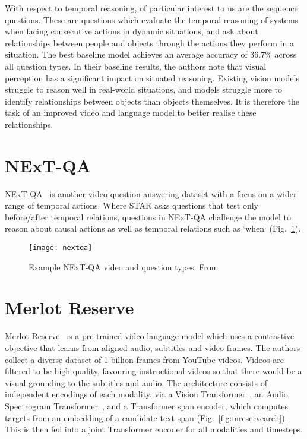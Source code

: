 With respect to temporal reasoning, of particular interest to us are the
sequence questions. These are questions which evaluate the temporal reasoning
of systems when facing consecutive actions in dynamic situations, and ask about
relationships between people and objects through the actions they perform in a
situation. The best baseline model achieves an average accuracy of 36.7\%
across all question types. In their baseline results, the authors note that
visual perception has a significant impact on situated reasoning. Existing
vision models struggle to reason well in real-world situations, and models
struggle more to identify relationships between objects than objects
themselves. It is therefore the task of an improved video and language model to
better realise these relationships.

\section{NExT-QA}

NExT-QA~\citep{xiao2021nextqa} is another video question answering dataset with
a focus on a wider range of temporal actions. Where STAR asks questions that
test only before/after temporal relations, questions in NExT-QA challenge the
model to reason about causal actions as well as temporal relations such as
`when` (Fig.~\ref{fig:nextqa}).

\begin{figure}[htpb]
	\centering
	\texttt{[image: nextqa]}
	\caption{Example NExT-QA video and question types.
		From~\citet{xiao2021nextqa}}
	\label{fig:nextqa}
\end{figure}

\section{Merlot Reserve}

Merlot Reserve~\citep{zellers2022mreserve} is a pre-trained video language model
which uses a contrastive objective that learns from aligned audio, subtitles
and video frames. The authors collect a diverse dataset of 1 billion frames
from YouTube videos. Videos are filtered to be high quality, favouring
instructional videos so that there would be a visual grounding to the subtitles
and audio. The architecture consists of independent encodings of each modality,
via a Vision Transformer~\citep{dosovitskiy2021vit}, an Audio Spectrogram
Transformer~\citep{gong2021ast}, and a Transformer span encoder, which computes
targets from an embedding of a candidate text span
(Fig.~\ref{fig:mreservearch}). This is then fed into a joint Transformer encoder
for all modalities and timesteps.


